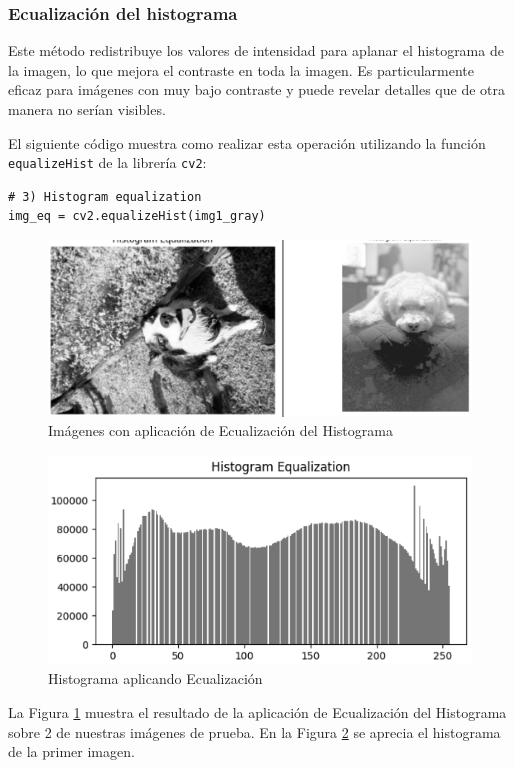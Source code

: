 \documentclass[12pt,letterpaper]{article}
\begin{document}
\subsubsection{Ecualización del histograma}
Este método redistribuye los valores de intensidad para aplanar el histograma de la imagen, lo que mejora el contraste en toda la imagen. Es particularmente eficaz para imágenes con muy bajo contraste y puede revelar detalles que de otra manera no serían visibles.


El siguiente código muestra como realizar esta operación utilizando la función \texttt{equalizeHist} de la librería \texttt{cv2}:
\begin{verbatim}
# 3) Histogram equalization
img_eq = cv2.equalizeHist(img1_gray)
\end{verbatim}

\begin{figure}[H]
  \centering
  \includegraphics[width=0.8\linewidth]{figuras/ecualizacion_imagen.png}
  \caption{Imágenes con aplicación de Ecualización del Histograma}
  \label{fig:ecualizacion_imagen}
\end{figure}

\begin{figure}[H]
  \centering
  \includegraphics[width=0.8\linewidth]{figuras/ecualizacion_histograma.png}
  \caption{Histograma aplicando Ecualización}
  \label{fig:ecualizacion_histograma}
\end{figure}

La Figura \ref{fig:ecualizacion_imagen} muestra el resultado de la aplicación de Ecualización del Histograma sobre 2 de nuestras imágenes de prueba. En la Figura \ref{fig:ecualizacion_histograma} se aprecia el histograma de la primer imagen.
\end{document}
